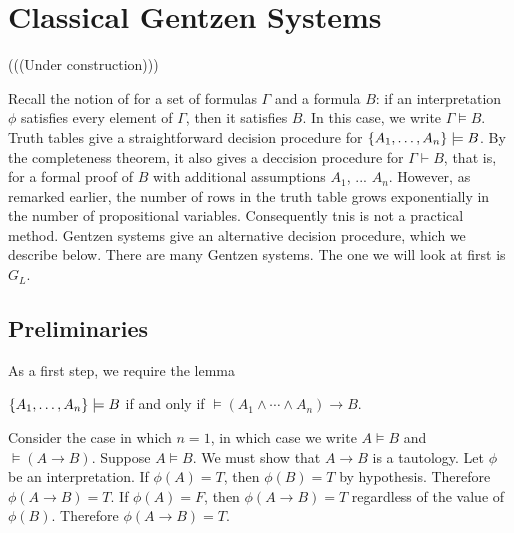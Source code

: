 

\begin{mathmacro}
\newcommand{\set}[1]{\{ #1 \}}
\end{mathmacro}


\section{Classical Gentzen Systems}

(((Under construction)))

\innertableofcontents

Recall the notion of  for a set of formulas $\Gamma$ and a formula $B$: if an interpretation $\phi$ satisfies every element of $\Gamma$, then it satisfies $B$.  In this case, we write $\Gamma \models B$.  Truth tables give a straightforward decision procedure for $\set{A_1, \ldots, A_n} \models B$. By the completeness theorem, it also gives a deccision procedure for $\Gamma \vdash B$, that is, for a formal proof of $B$ with additional assumptions $A_1$, ... $A_n$. However, as remarked earlier, the number of rows in the truth table grows exponentially in the number of propositional variables.  Consequently tnis is not a practical method.  Gentzen systems give an alternative decision procedure, which we describe below.  There are many Gentzen systems.  The one we will look at first is $G_L$.




\subsection{Preliminaries}

As a first step, we require the lemma

\begin{lemma}
$\set{A_1, \ldots, A_n} \models B$ if and only if $\models (A_1 \land \cdots \land A_n) \to B$.
\end{lemma}

Consider the case in which $n= 1$, in which case we write $A \models B$ and
$\models (A \to B)$.  Suppose $A \models B$. We must show that $A \to B$
 is a tautology.  Let $\phi$ be an interpretation.  If $\phi(A) = T$, then
$\phi(B) = T$ by hypothesis.  Therefore $\phi(A \to B) = T$.  If $\phi(A) = F$, then $\phi(A \to B) = T$ regardless of the value of $\phi(B)$.  Therefore $\phi(A \to B) = T$.

